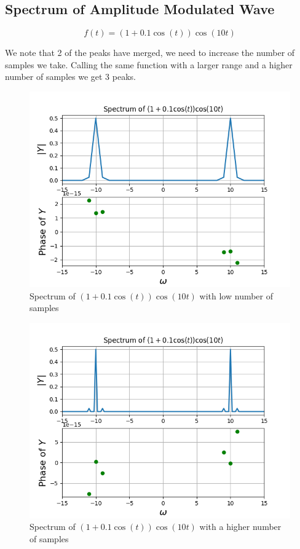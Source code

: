 \documentclass{article}
\begin{document}
\clearpage
\subsection{Spectrum of Amplitude Modulated Wave}

\begin{equation}
f(t) = (1+0.1\cos(t))\cos(10t)    
\end{equation}

We note that 2 of the peaks have merged, we need to increase the number of samples we take. Calling the same function with a larger range and a higher number of samples we get 3 peaks.

\begin{figure}[h!]
\centering
\includegraphics[scale=0.55]{Figure_3.png}
\caption{Spectrum of $(1+0.1\cos(t))\cos(10t)$ with low number of samples}
\label{fig:universe}
\end{figure}

\begin{figure}[h!]
\centering
\includegraphics[scale=0.55]{Figure_4.png}
\caption{Spectrum of $(1+0.1\cos(t))\cos(10t)$ with a higher number of samples}
\label{fig:universe}
\end{figure}
\clearpage
\end{document}
